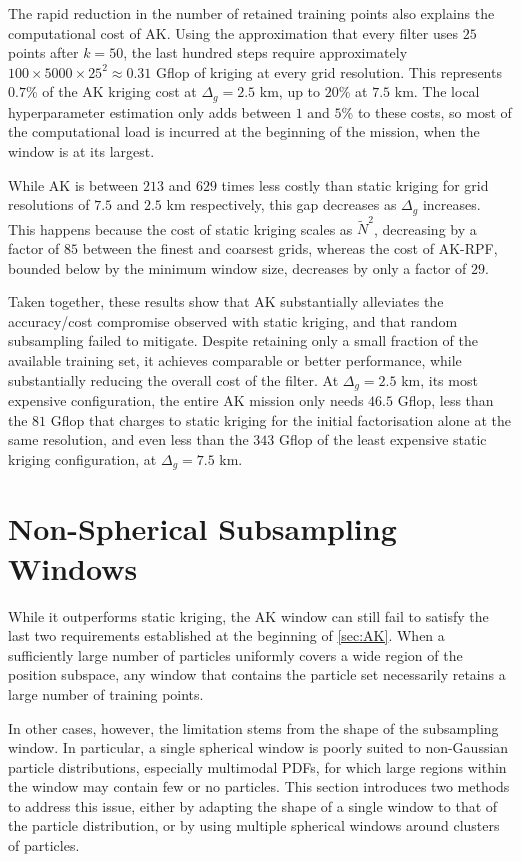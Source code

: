 The rapid reduction in the number of retained training points also explains the computational cost of AK. Using the approximation that every filter uses $25$ points after $k=50$, the last hundred steps require approximately $100\times5000\times25^2\approx0.31$ Gflop of kriging at every grid resolution. This represents $0.7\%$ of the AK kriging cost at $\Delta_g=2.5$ km, up to $20\%$ at $7.5$ km. The local hyperparameter estimation only adds between $1$ and $5\%$ to these costs, so most of the computational load is incurred at the beginning of the mission, when the window is at its largest.

While AK is between $213$ and $629$ times less costly than static kriging for grid resolutions of $7.5$ and $2.5$ km respectively, this gap decreases as $\Delta_g$ increases. This happens because the cost of static kriging scales as $\tilde{N}^2$, decreasing by a factor of $85$ between the finest and coarsest grids, whereas the cost of AK-RPF, bounded below by the minimum window size, decreases by only a factor of $29$.

Taken together, these results show that AK substantially alleviates the accuracy/cost compromise observed with static kriging, and that random subsampling failed to mitigate. Despite retaining only a small fraction of the available training set, it achieves comparable or better performance, while substantially reducing the overall cost of the filter. At $\Delta_g=2.5$ km, its most expensive configuration, the entire AK mission only needs $46.5$ Gflop, less than the $81$ Gflop that  charges to static kriging for the initial factorisation alone at the same resolution, and even less than the $343$ Gflop of the least expensive static kriging configuration, at $\Delta_g=7.5$ km.

\section{Non-Spherical Subsampling Windows}\label{sec:window_shape}

While it outperforms static kriging, the AK window can still fail to satisfy the last two requirements established at the beginning of \cref{sec:AK}. When a sufficiently large number of particles uniformly covers a wide region of the position subspace, any window that contains the particle set necessarily retains a large number of training points.

In other cases, however, the limitation stems from the shape of the subsampling window. In particular, a single spherical window is poorly suited to non-Gaussian particle distributions, especially multimodal PDFs, for which large regions within the window may contain few or no particles. This section introduces two methods to address this issue, either by adapting the shape of a single window to that of the particle distribution, or by using multiple spherical windows around clusters of particles.

